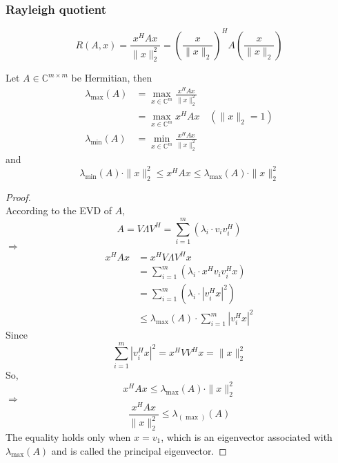 \begin{multicols}{2}
\subsubsection{Rayleigh quotient}
\begin{definition}
    \[
        R(A,x) = \frac{x^HAx}{\|x\|_2^2}=\left(\frac{x}{\|x\|_2}\right)^HA\left(\frac{x}{\|x\|_2}\right)
    \]
\end{definition}
\begin{theorem}
    Let $A\in\mathbb{C}^{m\times m}$ be Hermitian, then
    \[
        \begin{array}{ll}
            \lambda_{\max}(A)    & = \max_{x\in\mathbb{C}^m} \frac{x^HAx}{\|x\|_2^2} \\
                                 & = \max_{x\in\mathbb{C}^m} x^HAx \quad (\|x\|_2=1) \\
            \lambda_{\min}(A)    & = \min_{x\in\mathbb{C}^m} \frac{x^HAx}{\|x\|_2^2}
        \end{array}
    \]
    and 
    \[
        \lambda_{\min}(A)\cdot\|x\|_2^2 \leq x^HAx \leq \lambda_{\max}(A)\cdot\|x\|_2^2
    \] 
\end{theorem}
\begin{proof} \\
    According to the EVD of $A$,
    \[
        A = V \Lambda V^H = \sum_{i=1}^{m} (\lambda_i \cdot v_i v_i^H)
    \]
    $\Longrightarrow$
    \[
        \begin{array}{ll}
            x^HAx & = x^H V \Lambda V^H x  \\
            & = \sum_{i=1}^{m} (\lambda_i \cdot x^H v_i v_i^H x)  \\
            & = \sum_{i=1}^{m} (\lambda_i \cdot |v_i^Hx|^2)  \\ 
            & \leq \lambda_{\max}(A) \cdot \sum_{i=1}^{m} |v_i^Hx|^2
        \end{array}
    \]
    Since
    \[
        \sum_{i=1}^{m} |v_i^Hx|^2 = x^HVV^Hx = \|x\|_2^2
    \]
    So,
    \[
        x^HAx \leq \lambda_{\max}(A) \cdot \|x\|_2^2
    \]
    $\Longrightarrow$ 
    \[
        \frac{x^HAx}{\|x\|_2^2} \leq \lambda_(\max)(A)
    \]
    The equality holds only when $x=v_1$, which is an eigenvector associated with $\lambda_{\max}(A)$ and is called the principal eigenvector.
\end{proof}


\end{multicols}
